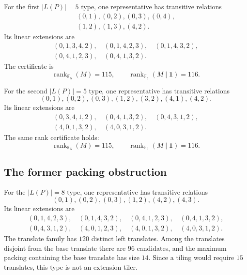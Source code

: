 For the first $|L(P)|=5$ type, one representative has transitive
relations
\[
\begin{gathered}
(0,1),(0,2),(0,3),(0,4),\\
(1,2),(1,3),(4,2).
\end{gathered}
\]
Its linear extensions are
\[
\begin{gathered}
(0,1,3,4,2),\quad (0,1,4,2,3),\quad
(0,1,4,3,2),\\
(0,4,1,2,3),\quad (0,4,1,3,2).
\end{gathered}
\]
The certificate is
\[
        \operatorname{rank}_{\mathbb F_5}(M)=115,\qquad
        \operatorname{rank}_{\mathbb F_5}(M\mid \mathbf 1)=116.
\]

For the second $|L(P)|=5$ type, one representative has transitive
relations
\[
(0,1),(0,2),(0,3),(1,2),(3,2),(4,1),(4,2).
\]
Its linear extensions are
\[
\begin{gathered}
(0,3,4,1,2),\quad (0,4,1,3,2),\quad
(0,4,3,1,2),\\
(4,0,1,3,2),\quad (4,0,3,1,2).
\end{gathered}
\]
The same rank certificate holds:
\[
        \operatorname{rank}_{\mathbb F_5}(M)=115,\qquad
        \operatorname{rank}_{\mathbb F_5}(M\mid \mathbf 1)=116.
\]

\subsection*{The former packing obstruction}

For the $|L(P)|=8$ type, one representative has transitive relations
\[
(0,1),(0,2),(0,3),(1,2),(4,2),(4,3).
\]
Its linear extensions are
\[
\begin{gathered}
(0,1,4,2,3),\quad (0,1,4,3,2),\quad
(0,4,1,2,3),\quad (0,4,1,3,2),\\
(0,4,3,1,2),\quad (4,0,1,2,3),\quad
(4,0,1,3,2),\quad (4,0,3,1,2).
\end{gathered}
\]
The translate family has $120$ distinct left translates.  Among the
translates disjoint from the base translate there are $96$ candidates,
and the maximum packing containing the base translate has size $14$.
Since a tiling would require $15$ translates, this type is not an
extension tiler.
